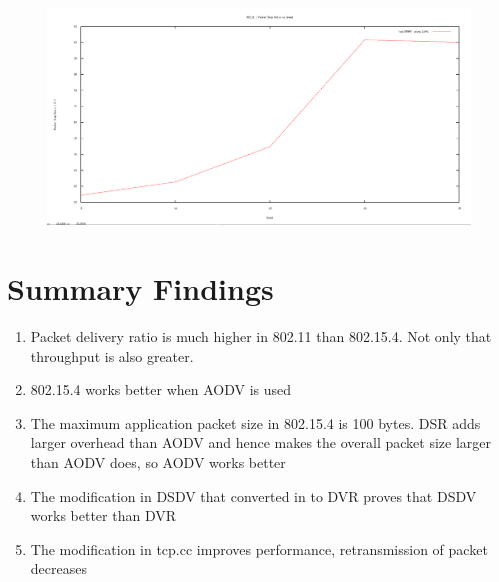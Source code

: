 \documentclass[12pt]{article}
\begin{document}
\begin{figure}[H]
	\centering
	\includegraphics[scale=	0.26]{image/apics/am_packetdropratio_vs_speed.png}
\end{figure}












\newpage
\section{Summary Findings}
\begin{enumerate}
    \item Packet delivery ratio is much higher in 802.11 than 802.15.4. Not only that throughput is also greater.
    
    \item 802.15.4 works better when AODV is used
    \item The maximum application packet size in 
802.15.4 is 100 bytes. DSR adds larger overhead than AODV and hence 
makes the overall packet size larger than AODV does, so AODV works better
    
    \item The modification in DSDV that converted in to DVR proves that DSDV works better than DVR
    
    \item The modification in tcp.cc improves performance, retransmission of packet decreases
\end{enumerate}

\end{document}
